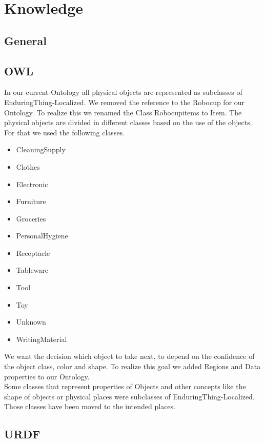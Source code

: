 \documentclass[main.tex]{subfiles}
\begin{document}
	
	\chapter{Knowledge}
		\section{General}
				


		\section{OWL}
		In our current Ontology all physical objects are represented as subclasses of EnduringThing-Localized. We removed the reference to the Robocup for our Ontology. To realize this we renamed the Class Robocupitems to Item. The physical objects are divided in different classes based on the use of the objects. For that we used the following classes.
		\begin{itemize}
		\item CleaningSupply
		\item Clothes
		\item Electronic
		\item Furniture
		\item Groceries
		\item PersonalHygiene
		\item Receptacle
		\item Tableware
		\item Tool
		\item Toy
		\item Unknown
		\item WritingMaterial
		\end{itemize}
		
		We want the decision which object to take next, to depend on the confidence of the object class, color and shape. To realize this goal we added Regions and Data properties to our Ontology.\\
		Some classes that represent properties of Objects and other concepts like the shape of objects or physical places were subclasses of EnduringThing-Localized. Those classes have been moved to the intended places.


		\section{URDF}
\end{document}
